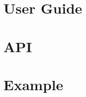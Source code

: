 \documentclass{book}
\begin{document}
\frontmatter
\maketitle
\tableofcontents

\mainmatter
\part{User Guide\label{User Guide}}



%
%
\part{API\label{API}}

\part{Example\label{Example}}

\end{document}
